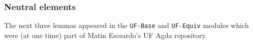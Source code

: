\subsubsection{Neutral elements}\label{neutral-elements}

The next three lemmas appeared in the \texttt{UF-Base} and
\texttt{UF-Equiv} modules which were (at one time) part of Matin
Escsardo's UF Agda repository.

\begin{code}%
\>[0]\<%
\\
\>[0]\AgdaSpace{}%
\AgdaSymbol{:}\AgdaSpace{}%
\AgdaSymbol{\{}\AgdaSpace{}%
\AgdaSymbol{:}\AgdaSpace{}%
\AgdaSymbol{\}}\AgdaSpace{}%
\AgdaSymbol{\{}\AgdaSpace{}%
\AgdaSymbol{:}\AgdaSpace{}%
\AgdaSpace{}%
\AgdaSpace{}%
\AgdaSymbol{\}}\AgdaSpace{}%
\AgdaSymbol{\{}\AgdaSpace{}%
\AgdaSpace{}%
\AgdaSymbol{:}\AgdaSpace{}%
\AgdaSymbol{\}}\AgdaSpace{}%
\AgdaSymbol{(}\AgdaSpace{}%
\AgdaSymbol{:}\AgdaSpace{}%
\AgdaSpace{}%
\AgdaSpace{}%
\AgdaSymbol{)}\AgdaSpace{}%
\AgdaSpace{}%
\AgdaSymbol{(}\AgdaSpace{}%
\AgdaSymbol{\AgdaUnderscore{})}\AgdaSpace{}%
\AgdaSpace{}%
\AgdaSpace{}%
\AgdaSpace{}%
\<%
\\
\>[0]\AgdaSpace{}%
\AgdaSymbol{(}\AgdaSpace{}%
\AgdaSymbol{\AgdaUnderscore{})}\AgdaSpace{}%
\AgdaSymbol{=}\AgdaSpace{}%
\AgdaSpace{}%
\AgdaSymbol{\AgdaUnderscore{}}\<%
\\
%
\\[\AgdaEmptyExtraSkip]%
\>[0]\AgdaSpace{}%
\AgdaSymbol{:}\AgdaSpace{}%
\AgdaSymbol{\{}\AgdaSpace{}%
\AgdaSymbol{:}\AgdaSpace{}%
\AgdaSymbol{\}\{}\AgdaSpace{}%
\AgdaSymbol{:}\AgdaSpace{}%
\AgdaSpace{}%
\AgdaSpace{}%
\AgdaSymbol{\}}\AgdaSpace{}%
\AgdaSymbol{\{}\AgdaSpace{}%
\AgdaSpace{}%
\AgdaSymbol{:}\AgdaSpace{}%
\AgdaSymbol{\}}\AgdaSpace{}%
\AgdaSymbol{(}\AgdaSpace{}%
\AgdaSymbol{:}\AgdaSpace{}%
\AgdaSpace{}%
\AgdaSpace{}%
\AgdaSymbol{)}\AgdaSpace{}%

\end{code}
